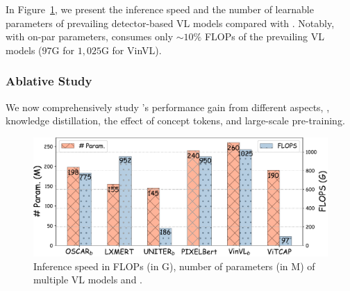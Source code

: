 In Figure~\ref{fig:flops}, we present the inference speed and the number of learnable parameters of prevailing detector-based VL models compared with \vitcap\!\!. Notably, with on-par parameters, \vitcap consumes only $\sim10\%$ FLOPs of the prevailing VL models ($97$G for \vitcap \vs  $1,025$G for VinVL).

\subsubsection{Ablative Study}
We now comprehensively study \vitcap\!'s performance gain from different aspects, \ie, knowledge distillation, the effect of concept tokens, and large-scale pre-training.


\begin{figure}[t]
    \centering
  \includegraphics[width=.78\textwidth]{images/flops.pdf}
    \caption {\small Inference speed in FLOPs (in G), number of parameters (in M) of multiple VL models and \vitcapp\!\!.}
    \vspace{-1mm}
\label{fig:flops}
\end{figure}






